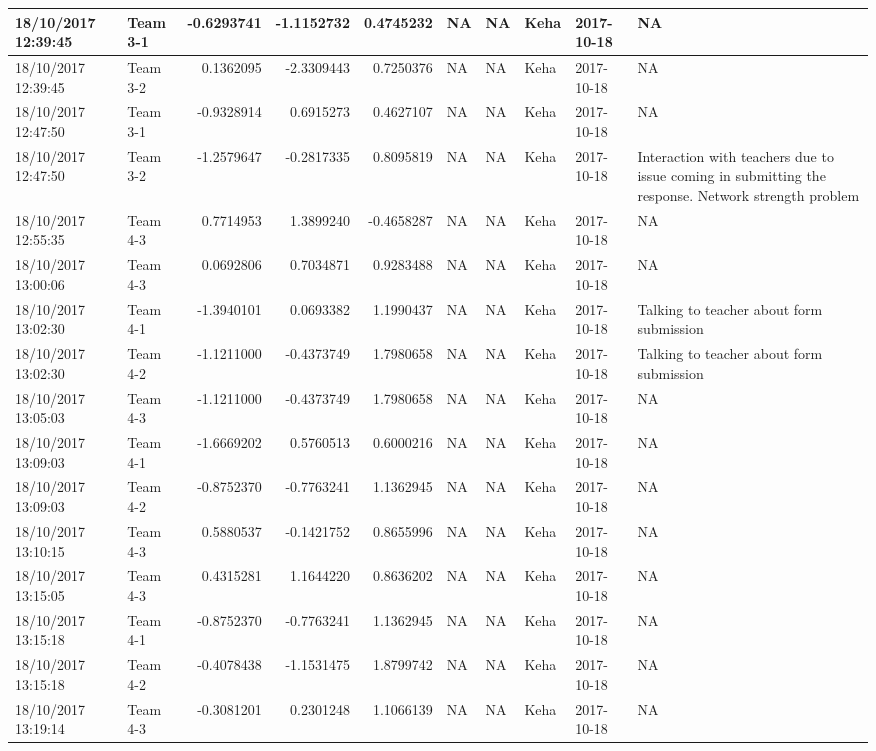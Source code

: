 \documentclass[]{article}
\begin{document}
\begin{tabular}{l|l|r|r|r|l|l|l|l|l}
\hline
18/10/2017 12:39:45 & Team 3-1 & -0.6293741 & -1.1152732 & 0.4745232 & NA & NA & Keha & 2017-10-18 & NA\\
\hline
18/10/2017 12:39:45 & Team 3-2 & 0.1362095 & -2.3309443 & 0.7250376 & NA & NA & Keha & 2017-10-18 & NA\\
\hline
18/10/2017 12:47:50 & Team 3-1 & -0.9328914 & 0.6915273 & 0.4627107 & NA & NA & Keha & 2017-10-18 & NA\\
\hline
18/10/2017 12:47:50 & Team 3-2 & -1.2579647 & -0.2817335 & 0.8095819 & NA & NA & Keha & 2017-10-18 & Interaction with teachers due to issue coming in submitting the response. Network strength problem\\
\hline
18/10/2017 12:55:35 & Team 4-3 & 0.7714953 & 1.3899240 & -0.4658287 & NA & NA & Keha & 2017-10-18 & NA\\
\hline
18/10/2017 13:00:06 & Team 4-3 & 0.0692806 & 0.7034871 & 0.9283488 & NA & NA & Keha & 2017-10-18 & NA\\
\hline
18/10/2017 13:02:30 & Team 4-1 & -1.3940101 & 0.0693382 & 1.1990437 & NA & NA & Keha & 2017-10-18 & Talking to teacher about form submission\\
\hline
18/10/2017 13:02:30 & Team 4-2 & -1.1211000 & -0.4373749 & 1.7980658 & NA & NA & Keha & 2017-10-18 & Talking to teacher about form submission\\
\hline
18/10/2017 13:05:03 & Team 4-3 & -1.1211000 & -0.4373749 & 1.7980658 & NA & NA & Keha & 2017-10-18 & NA\\
\hline
18/10/2017 13:09:03 & Team 4-1 & -1.6669202 & 0.5760513 & 0.6000216 & NA & NA & Keha & 2017-10-18 & NA\\
\hline
18/10/2017 13:09:03 & Team 4-2 & -0.8752370 & -0.7763241 & 1.1362945 & NA & NA & Keha & 2017-10-18 & NA\\
\hline
18/10/2017 13:10:15 & Team 4-3 & 0.5880537 & -0.1421752 & 0.8655996 & NA & NA & Keha & 2017-10-18 & NA\\
\hline
18/10/2017 13:15:05 & Team 4-3 & 0.4315281 & 1.1644220 & 0.8636202 & NA & NA & Keha & 2017-10-18 & NA\\
\hline
18/10/2017 13:15:18 & Team 4-1 & -0.8752370 & -0.7763241 & 1.1362945 & NA & NA & Keha & 2017-10-18 & NA\\
\hline
18/10/2017 13:15:18 & Team 4-2 & -0.4078438 & -1.1531475 & 1.8799742 & NA & NA & Keha & 2017-10-18 & NA\\
\hline
18/10/2017 13:19:14 & Team 4-3 & -0.3081201 & 0.2301248 & 1.1066139 & NA & NA & Keha & 2017-10-18 & NA\\

\end{tabular}
\end{document}
